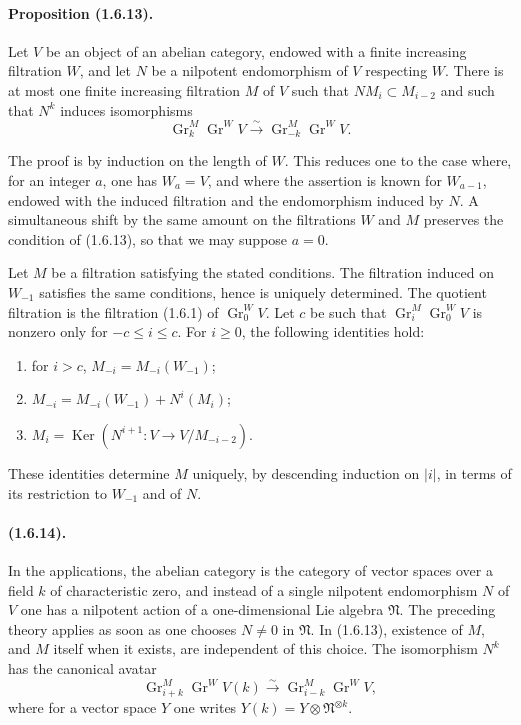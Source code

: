 \documentclass[11pt]{article}
\theoremstyle{remark}
\newcommand{\Gr}{\operatorname{Gr}}
\newcommand{\Ker}{\operatorname{Ker}}
\begin{document}
\paragraph{Proposition (1.6.13).}
Let $V$ be an object of an abelian category, endowed with a finite increasing filtration $W$, and let $N$ be a nilpotent endomorphism of $V$ respecting $W$. There is at most one finite increasing filtration $M$ of $V$ such that $NM_i\subset M_{i-2}$ and such that $N^k$ induces isomorphisms
\[
\Gr^M_k\Gr^W V\xrightarrow{\sim}\Gr^M_{-k}\Gr^W V.
\]

The proof is by induction on the length of $W$. This reduces one to the case where, for an integer $a$, one has $W_a=V$, and where the assertion is known for $W_{a-1}$, endowed with the induced filtration and the endomorphism induced by $N$. A simultaneous shift by the same amount on the filtrations $W$ and $M$ preserves the condition of (1.6.13), so that we may suppose $a=0$.

Let $M$ be a filtration satisfying the stated conditions. The filtration induced on $W_{-1}$ satisfies the same conditions, hence is uniquely determined. The quotient filtration is the filtration (1.6.1) of $\Gr^W_0V$. Let $c$ be such that $\Gr^M_i\Gr^W_0V$ is nonzero only for $-c\le i\le c$. For $i\ge0$, the following identities hold:
\begin{enumerate}[label=\arabic*)]
\item for $i>c$, $M_{-i}=M_{-i}(W_{-1})$;
\item $M_{-i}=M_{-i}(W_{-1})+N^i(M_i)$;
\item $M_i=\Ker(N^{i+1}:V\to V/M_{-i-2})$.
\end{enumerate}
These identities determine $M$ uniquely, by descending induction on $|i|$, in terms of its restriction to $W_{-1}$ and of $N$.

\paragraph{(1.6.14).}
In the applications, the abelian category is the category of vector spaces over a field $k$ of characteristic zero, and instead of a single nilpotent endomorphism $N$ of $V$ one has a nilpotent action of a one-dimensional Lie algebra $\mathfrak N$. The preceding theory applies as soon as one chooses $N\ne0$ in $\mathfrak N$. In (1.6.13), existence of $M$, and $M$ itself when it exists, are independent of this choice. The isomorphism $N^k$ has the canonical avatar
\begin{equation}\tag{1.6.14.1}
\Gr^M_{i+k}\Gr^W V(k)\xrightarrow{\sim}\Gr^M_{i-k}\Gr^W V,
\end{equation}
where for a vector space $Y$ one writes $Y(k)=Y\otimes \mathfrak N^{\otimes k}$.
\end{document}
